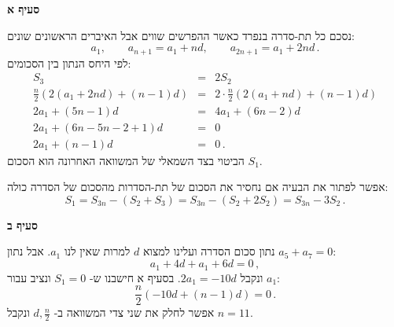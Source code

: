 \textbf{סעיף א}

נסכם כל תת-סדרה בנפרד כאשר ההפרשים שווים אבל האיברים הראשונים שונים:
\[
a_1,\quad\quad a_{n+1} = a_1 + nd, \quad\quad a_{2n+1} = a_1 + 2nd\,.
\]
לפי היחס הנתון בין הסכומים:
\vspace{-2ex}
\[
\renewcommand{\arraystretch}{1.2}
\begin{array}{lll}
S_3&=&2S_2\\
\frac{n}{2}(2(a_1+2nd)+(n-1)d)&=&2\cdot \frac{n}{2}(2(a_1+nd)+(n-1)d)\\
2a_1+(5n-1)d&=&4a_1+(6n-2)d\\
2a_1+(6n-5n-2+1)d&=&0\\
2a_1+(n-1)d&=&0\,.
\end{array}
\]
הביטוי בצד השמאלי של המשוואה האחרונה הוא הסכום 
$S_1$.

אפשר לפתור את הבעיה אם נחסיר את הסכום של תת-הסדרות מהסכום של הסדרה כולה:
\[
S_1 = S_{3n} - (S_2+S_3) =  S_{3n} - (S_2 + 2S_2) = S_{3n} - 3S_2\,.
\]

\vspace{-2ex}

\hspace*{1.5em}
\newpage

\textbf{סעיף ב}

נתון סכום הסדרה ועלינו למצוא
$d$
למרות שאין לנו 
$a_1$.
אבל נתון
$a_5+a_7=0$:
\[
a_1 + 4d + a_1 + 6d = 0\,,
\]
ונקבל
$2a_1=-10d$.
בסעיף א חישבנו ש-%
$S_1=0$
ונציב עבור 
$a_1$:
\[
\frac{n}{2}(-10d+(n-1)d)=0\,.
\]
אפשר לחלק את שני צדי המשוואה ב-%
$d,\frac{n}{2}$
ונקבל
$n=11$.

